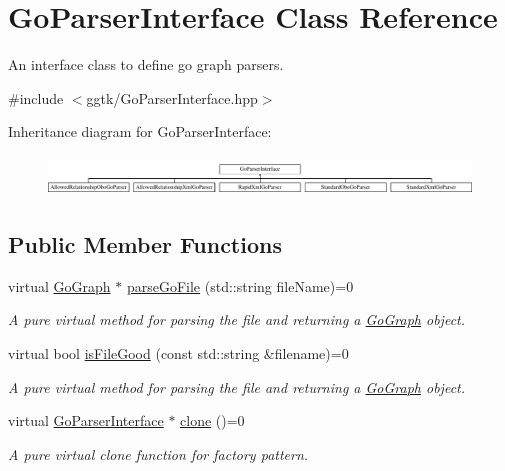 \hypertarget{classGoParserInterface}{}\section{Go\+Parser\+Interface Class Reference}
\label{classGoParserInterface}


An interface class to define go graph parsers.  




{\ttfamily \#include $<$ggtk/\+Go\+Parser\+Interface.\+hpp$>$}

Inheritance diagram for Go\+Parser\+Interface\+:\begin{figure}[H]
\begin{center}
\leavevmode
\includegraphics[height=1.061611cm]{classGoParserInterface}
\end{center}
\end{figure}
\subsection*{Public Member Functions}
\begin{DoxyCompactItemize}
\item 
virtual \hyperlink{classGoGraph}{Go\+Graph} $\ast$ \hyperlink{classGoParserInterface_aefde440e0d5404b9efa2a16a89e09674}{parse\+Go\+File} (std\+::string file\+Name)=0
\begin{DoxyCompactList}\small\item\em A pure virtual method for parsing the file and returning a \hyperlink{classGoGraph}{Go\+Graph} object. \end{DoxyCompactList}\item 
virtual bool \hyperlink{classGoParserInterface_a0d2db54063c1ff58a0e15f0187af5aa1}{is\+File\+Good} (const std\+::string \&filename)=0
\begin{DoxyCompactList}\small\item\em A pure virtual method for parsing the file and returning a \hyperlink{classGoGraph}{Go\+Graph} object. \end{DoxyCompactList}\item 
virtual \hyperlink{classGoParserInterface}{Go\+Parser\+Interface} $\ast$ \hyperlink{classGoParserInterface_a21c4ea01809737ab2975fb71edf6fcd5}{clone} ()=0
\begin{DoxyCompactList}\small\item\em A pure virtual clone function for factory pattern. \end{DoxyCompactList}\end{DoxyCompactItemize}


